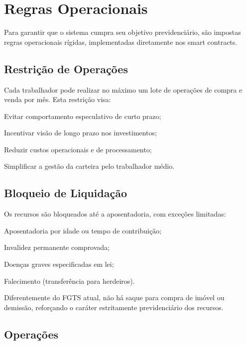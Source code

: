 \section{Regras Operacionais}

Para garantir que o sistema cumpra seu objetivo previdenciário, são impostas regras operacionais rígidas, implementadas diretamente nos smart contracts.

\subsection{Restrição de Operações}

Cada trabalhador pode realizar no máximo um lote de operações de compra e venda por mês. Esta restrição visa:

\begin{alineas}
    \item Evitar comportamento especulativo de curto prazo;
    \item Incentivar visão de longo prazo nos investimentos;
    \item Reduzir custos operacionais e de processamento;
    \item Simplificar a gestão da carteira pelo trabalhador médio.
\end{alineas}

\subsection{Bloqueio de Liquidação}

Os recursos são bloqueados até a aposentadoria, com exceções limitadas:

\begin{alineas}
    \item Aposentadoria por idade ou tempo de contribuição;
    \item Invalidez permanente comprovada;
    \item Doenças graves especificadas em lei;
    \item Falecimento (transferência para herdeiros).
\end{alineas}

Diferentemente do FGTS atual, não há saque para compra de imóvel ou demissão, reforçando o caráter estritamente previdenciário dos recursos.

\subsection{Operações}

